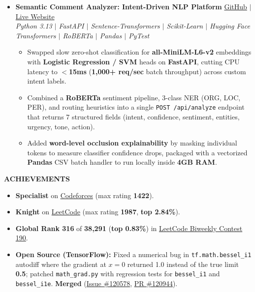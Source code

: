 \documentclass[10pt]{article}
\newcommand{\resheading}[1]{{\small \colorbox{mygrey}{\begin{minipage}{\dimexpr\textwidth-2\fboxsep\relax}\textbf{#1 \vphantom{p\^{E}}}\end{minipage}}}}
\begin{document}
\begin{itemize}[leftmargin=*]
\vspace{2pt}
\item \textbf{Semantic Comment Analyzer: Intent-Driven NLP Platform} \hfill
\href{https://github.com/rachit-mangawa/Semantic-Comment-Analyze}{GitHub} $|$ \href{https://rachit-mangawa.github.io/Semantic-Comment-Analyze/}{Live Website} \\
\textit{\footnotesize Python 3.13 $|$ FastAPI $|$ Sentence-Transformers $|$ Scikit-Learn $|$ Hugging Face Transformers $|$ RoBERTa $|$ Pandas $|$ PyTest}
\begin{itemize}[noitemsep, leftmargin=*]\footnotesize
\item Swapped slow zero-shot classification for \textbf{all-MiniLM-L6-v2} embeddings with \textbf{Logistic Regression / SVM} heads on \textbf{FastAPI}, cutting CPU latency to \textbf{$<$15ms} (\textbf{1,000+ req/sec} batch throughput) across custom intent labels.
\item Combined a \textbf{RoBERTa} sentiment pipeline, 3-class NER (ORG, LOC, PER), and routing heuristics into a single \texttt{POST /api/analyze} endpoint that returns 7 structured fields (intent, confidence, sentiment, entities, urgency, tone, action).
\item Added \textbf{word-level occlusion explainability} by masking individual tokens to measure classifier confidence drops, packaged with a vectorized \textbf{Pandas} CSV batch handler to run locally inside \textbf{4GB RAM}.
\end{itemize}
\end{itemize}

\noindent
\resheading{ACHIEVEMENTS}
\begin{itemize}[noitemsep, leftmargin=*]\small
\item \textbf{Specialist} on \href{https://codeforces.com/profile/i_win_again}{Codeforces} (max rating \textbf{1422}).
\item \textbf{Knight} on \href{https://leetcode.com/u/rachit-mangawa/}{LeetCode} (max rating \textbf{1987}, \textbf{top 2.84\%}).
\item \textbf{Global Rank 316} of \textbf{38,291} (\textbf{top 0.83\%}) in \href{https://leetcode.com/contest/biweekly-contest-190/}{LeetCode Biweekly Contest 190}.
\item \textbf{Open Source (TensorFlow):} Fixed a numerical bug in \texttt{tf.math.bessel\_i1} autodiff where the gradient at $x{=}0$ returned 1.0 instead of the true limit \textbf{0.5}; patched \texttt{math\_grad.py} with regression tests for \texttt{bessel\_i1} and \texttt{bessel\_i1e}. \textbf{Merged} (\href{https://github.com/tensorflow/tensorflow/issues/120578}{Issue \#120578}, \href{https://github.com/tensorflow/tensorflow/pull/120944}{PR \#120944}).
\end{itemize}
\end{document}
